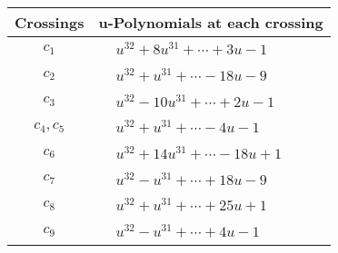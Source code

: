 \documentclass[1p]{elsarticle_modified}
\theoremstyle{definition}
\begin{document}
\begin{tabular}{m{50pt}|m{274pt}}
Crossings & \hspace{64pt}u-Polynomials at each crossing \\
\hline $$\begin{aligned}c_{1}\end{aligned}$$&$\begin{aligned}
&u^{32}+8 u^{31}+\cdots+3 u-1
\end{aligned}$\\
\hline $$\begin{aligned}c_{2}\end{aligned}$$&$\begin{aligned}
&u^{32}+u^{31}+\cdots-18 u-9
\end{aligned}$\\
\hline $$\begin{aligned}c_{3}\end{aligned}$$&$\begin{aligned}
&u^{32}-10 u^{31}+\cdots+2 u-1
\end{aligned}$\\
\hline $$\begin{aligned}c_{4},c_{5}\end{aligned}$$&$\begin{aligned}
&u^{32}+u^{31}+\cdots-4 u-1
\end{aligned}$\\
\hline $$\begin{aligned}c_{6}\end{aligned}$$&$\begin{aligned}
&u^{32}+14 u^{31}+\cdots-18 u+1
\end{aligned}$\\
\hline $$\begin{aligned}c_{7}\end{aligned}$$&$\begin{aligned}
&u^{32}- u^{31}+\cdots+18 u-9
\end{aligned}$\\
\hline $$\begin{aligned}c_{8}\end{aligned}$$&$\begin{aligned}
&u^{32}+u^{31}+\cdots+25 u+1
\end{aligned}$\\
\hline $$\begin{aligned}c_{9}\end{aligned}$$&$\begin{aligned}
&u^{32}- u^{31}+\cdots+4 u-1
\end{aligned}$\\

\end{tabular}
\end{document}
